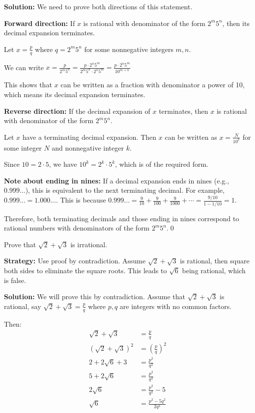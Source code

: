 \bigskip\noindent\textbf{Solution:}
We need to prove both directions of this statement.

\textbf{Forward direction:} If $x$ is rational with denominator of the form $2^m 5^n$, then its decimal expansion terminates.

Let $x = \frac{p}{q}$ where $q = 2^m 5^n$ for some nonnegative integers $m, n$.

We can write $x = \frac{p}{2^m 5^n} = \frac{p \cdot 2^n 5^m}{2^m 5^n \cdot 2^n 5^m} = \frac{p \cdot 2^n 5^m}{10^{m+n}}$

This shows that $x$ can be written as a fraction with denominator a power of 10, which means its decimal expansion terminates.

\textbf{Reverse direction:} If the decimal expansion of $x$ terminates, then $x$ is rational with denominator of the form $2^m 5^n$.

Let $x$ have a terminating decimal expansion. Then $x$ can be written as $x = \frac{N}{10^k}$ for some integer $N$ and nonnegative integer $k$.

Since $10 = 2 \cdot 5$, we have $10^k = 2^k \cdot 5^k$, which is of the required form.

\textbf{Note about ending in nines:}
If a decimal expansion ends in nines (e.g., $0.999\ldots$), this is equivalent to the next terminating decimal. For example, $0.999\ldots = 1.000\ldots$. This is because $0.999\ldots = \frac{9}{10} + \frac{9}{100} + \frac{9}{1000} + \cdots = \frac{9/10}{1 - 1/10} = 1$.

Therefore, both terminating decimals and those ending in nines correspond to rational numbers with denominators of the form $2^m 5^n$.\qed


\begin{problembox}
Prove that $\sqrt{2} + \sqrt{3}$ is irrational.
\end{problembox}

\noindent\textbf{Strategy:} Use proof by contradiction. Assume $\sqrt{2} + \sqrt{3}$ is rational, then square both sides to eliminate the square roots. This leads to $\sqrt{6}$ being rational, which is false.

\bigskip\noindent\textbf{Solution:}
We will prove this by contradiction. Assume that $\sqrt{2} + \sqrt{3}$ is rational, say $\sqrt{2} + \sqrt{3} = \frac{p}{q}$ where $p, q$ are integers with no common factors.

Then:
\begin{align*}
\sqrt{2} + \sqrt{3} &= \frac{p}{q} \\
(\sqrt{2} + \sqrt{3})^2 &= \left(\frac{p}{q}\right)^2 \\
2 + 2\sqrt{6} + 3 &= \frac{p^2}{q^2} \\
5 + 2\sqrt{6} &= \frac{p^2}{q^2} \\
2\sqrt{6} &= \frac{p^2}{q^2} - 5 \\
\sqrt{6} &= \frac{p^2 - 5q^2}{2q^2}
\end{align*}


